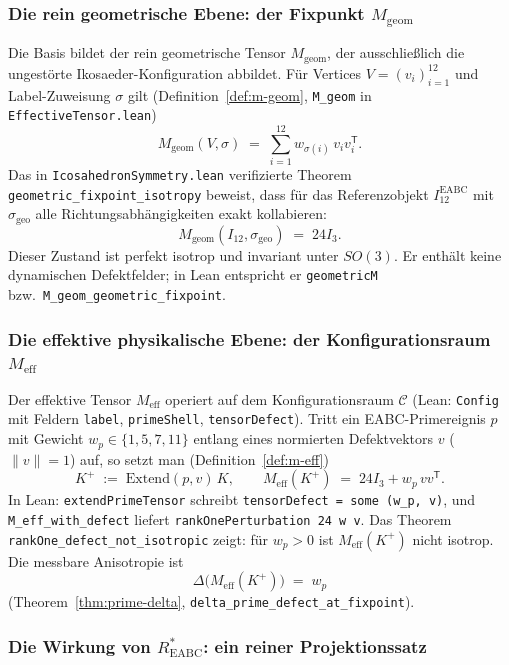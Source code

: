 \documentclass[11pt,a4paper]{article}
\begin{document}
\subsubsection{Die rein geometrische Ebene: der Fixpunkt $M_{\mathrm{geom}}$}

Die Basis bildet der rein geometrische Tensor $M_{\mathrm{geom}}$, der ausschließlich
die ungestörte Ikosaeder-Konfiguration abbildet.
Für Vertices $V=(v_i)_{i=1}^{12}$ und Label-Zuweisung $\sigma$ gilt
(Definition~\ref{def:m-geom}, \texttt{M\_geom} in \texttt{EffectiveTensor.lean})
\[
  M_{\mathrm{geom}}(V,\sigma)
  \;=\;
  \sum_{i=1}^{12} w_{\sigma(i)}\, v_i v_i^{\mathsf T}.
\]
Das in \texttt{IcosahedronSymmetry.lean} verifizierte Theorem
\texttt{geometric\_fixpoint\_isotropy} beweist, dass für das Referenzobjekt
$I_{12}^{\mathrm{EABC}}$ mit $\sigma_{\mathrm{geo}}$ alle Richtungsabhängigkeiten
exakt kollabieren:
\[
  \boxed{
  M_{\mathrm{geom}}(I_{12},\sigma_{\mathrm{geo}}) \;=\; 24I_3
  }.
\]
Dieser Zustand ist perfekt isotrop und invariant unter $SO(3)$.
Er enthält keine dynamischen Defektfelder; in Lean entspricht er
\texttt{geometricM} bzw.\ \texttt{M\_geom\_geometric\_fixpoint}.

\subsubsection{Die effektive physikalische Ebene: der Konfigurationsraum $M_{\mathrm{eff}}$}

Der effektive Tensor $M_{\mathrm{eff}}$ operiert auf dem Konfigurationsraum
$\mathcal{C}$ (Lean: \texttt{Config} mit Feldern \texttt{label},
\texttt{primeShell}, \texttt{tensorDefect}).
Tritt ein EABC-Primereignis $p$ mit Gewicht $w_p\in\{1,5,7,11\}$ entlang eines
normierten Defektvektors $v$ ($\|v\|=1$) auf, so setzt man
(Definition~\ref{def:m-eff})
\[
  K^+ \;:=\; \mathrm{Extend}(p,v)\,K,
  \qquad
  M_{\mathrm{eff}}(K^+) \;=\; 24I_3 + w_p\,vv^{\mathsf T}.
\]
In Lean: \texttt{extendPrimeTensor} schreibt \texttt{tensorDefect = some (w\_p, v)},
und \texttt{M\_eff\_with\_defect} liefert \texttt{rankOnePerturbation 24 w v}.
Das Theorem \texttt{rankOne\_defect\_not\_isotropic} zeigt: für $w_p>0$ ist
$M_{\mathrm{eff}}(K^+)$ nicht isotrop.
Die messbare Anisotropie ist
\[
  \Delta\bigl(M_{\mathrm{eff}}(K^+)\bigr) \;=\; w_p
\]
(Theorem~\ref{thm:prime-delta}, \texttt{delta\_prime\_defect\_at\_fixpoint}).

\subsubsection{Die Wirkung von $R^*_{\mathrm{EABC}}$: ein reiner Projektionssatz}
\end{document}
